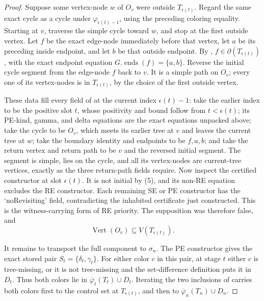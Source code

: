 \begin{proof}
Suppose some vertex-node \(w\) of \(O_v\) were outside
\(T_{\epsilon(t)}\).  Regard the same exact cycle as a cycle under
\(\varphi_{\epsilon(t)-1}\), using the preceding coloring equality.
Starting at \(v\), traverse the simple cycle toward \(w\), and stop at
the first outside vertex.  Let \(f\) be the exact edge-node immediately
before that vertex, let \(a\) be its preceding inside endpoint, and let
\(b\) be that outside endpoint.  By ,
\(f\in\partial(T_{\epsilon(t)})\), with the exact endpoint equation
\(G.\operatorname{ends}(f)=\{a,b\}\).  Reverse the initial cycle segment
from the edge-node \(f\) back to \(v\).  It is a simple path on \(O_v\);
every one of its vertex-nodes is in \(T_{\epsilon(t)}\), by the choice of
the first outside vertex.

These data fill every field of
 at the current index
\(\epsilon(t)-1\): take the earlier index to be the positive slot \(t\),
whose positivity and bound follow from \(t<\epsilon(t)\); its PE-kind,
gamma, and delta equations are the exact equations unpacked above; take
the cycle to be \(O_v\), which meets its earlier tree at \(v\) and leaves
the current tree at \(w\); take the boundary identity and endpoints to be
\(f,a,b\); and take the return vertex and return path to be \(v\) and the
reversed initial segment.  The segment is simple, lies on the cycle, and
all its vertex-nodes are current-tree vertices, exactly as the three
return-path fields require.  Now inspect the certified constructor at
slot \(\epsilon(t)\).  It is not initial by (5), and its non-RE equation
excludes the RE constructor.  Each remaining SE or PE constructor has the
`noRevisiting' field, contradicting the inhabited certificate just
constructed.  This is the witness-carrying form of RE priority.  The
supposition was therefore false, and
\[
  \operatorname{Vert}(O_v)\subseteq V(T_{\epsilon(t)}).          \tag{6}
\]

It remains to transport the full component to \(\sigma_n\).  The PE
constructor gives the exact stored pair
\(S_t=\{\delta_t,\gamma_t\}\).  For either color \(c\) in this pair,
at stage \(t\) either \(c\) is tree-missing, or it is not tree-missing
and the set-difference definition  puts it
in \(D_t\).  Thus both colors lie in
\(\overline\varphi_t(T_t)\cup D_t\).  Iterating the two inclusions of
 carries both colors first to the
control set at \(T_{\epsilon(t)}\), and then to
\(\overline\varphi_n(T_n)\cup D_n\).


\end{proof}

